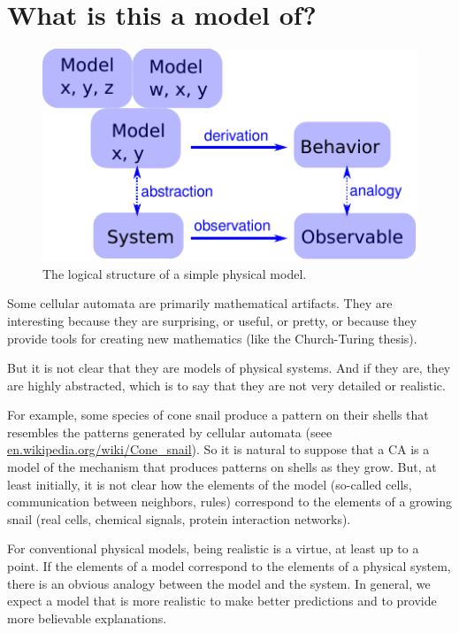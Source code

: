 \documentclass[10pt]{book}
\begin{document}
\section{What is this a model of?}
\label{model3}

\begin{figure}
\centerline{\includegraphics[height=2.5in]{figs/model3.pdf}}
\caption{The logical structure of a simple physical model.\label{fig.model3}}
\end{figure}

Some cellular automata are primarily mathematical artifacts.
They are interesting because they are surprising,
or useful, or pretty, or because they provide tools for
creating new mathematics (like the Church-Turing thesis).

But it is not clear that they are models of physical systems.  And if
they are, they are highly abstracted, which is to say that they are
not very detailed or realistic.

For example, some species of cone
snail produce a
pattern on their shells that resembles the patterns generated by
cellular automata (seee \url{en.wikipedia.org/wiki/Cone_snail}).
So it is natural to suppose that a CA is a model of the mechanism that
produces patterns on shells as they grow.  But, at least initially, it
is not clear how the elements of the model (so-called cells,
communication between neighbors, rules) correspond to the elements of
a growing snail (real cells, chemical signals, protein interaction
networks).

For conventional physical models, being realistic is a virtue, at
least up to a point.  If the elements of a model correspond to the
elements of a physical system, there is an obvious analogy between the
model and the system.  In general, we expect a model that is more
realistic to make better predictions and to provide more believable
explanations.
\end{document}
